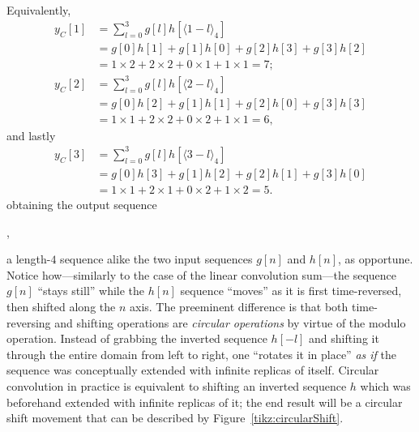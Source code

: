 \documentclass[\documentfontsize, twocolumn]{\classname}
\begin{document}
Equivalently,
\begin{align*}
    y_C[1]
    &= \sum_{l=0}^{3} g[l] h[\langle 1 -l\rangle_4] \\
    &= g[0]h[1] + g[1]h[0] + g[2]h[3] + g[3]h[2]\\
    &= 1\times 2 + 2 \times 2 + 0 \times 1 + 1 \times 1 = 7;\\
    y_C[2]
    &= \sum_{l=0}^{3} g[l] h[\langle 2 -l\rangle_4] \\
    &= g[0]h[2] + g[1]h[1] + g[2]h[0] + g[3]h[3]\\
    &= 1\times 1 + 2 \times 2 + 0 \times 2 + 1 \times 1 = 6,
\end{align*}
and lastly
\begin{align*}
    y_C[3]
    &= \sum_{l=0}^{3} g[l] h[\langle 3 -l\rangle_4] \\
    &= g[0]h[3] + g[1]h[2] + g[2]h[1] + g[3]h[0]\\
    &= 1\times 1 + 2 \times 1 + 0 \times 2 + 1 \times 2 = 5.
\end{align*}
obtaining the output sequence
\begin{center}
    ,
\end{center}
a length-$4$ sequence alike the two input sequences $g[n]$ and $h[n]$, as opportune. Notice how---similarly to the case of the linear convolution sum---the sequence $g[n]$ ``stays still'' while the $h[n]$ sequence ``moves'' as it is first time-reversed, then shifted along the $n$ axis. The preeminent difference is that both time-reversing and shifting operations are \emph{circular operations} by virtue of the modulo operation. Instead of grabbing the inverted sequence $h[-l]$ and shifting it through the entire domain from left to right, one ``rotates it in place'' \emph{as if} the sequence was conceptually extended with infinite replicas of itself. Circular convolution in practice is equivalent to shifting an inverted sequence $h$ which was beforehand extended with infinite replicas of it; the end result will be a circular shift movement that can be described by Figure~\ref{tikz:circularShift}.
\end{document}
